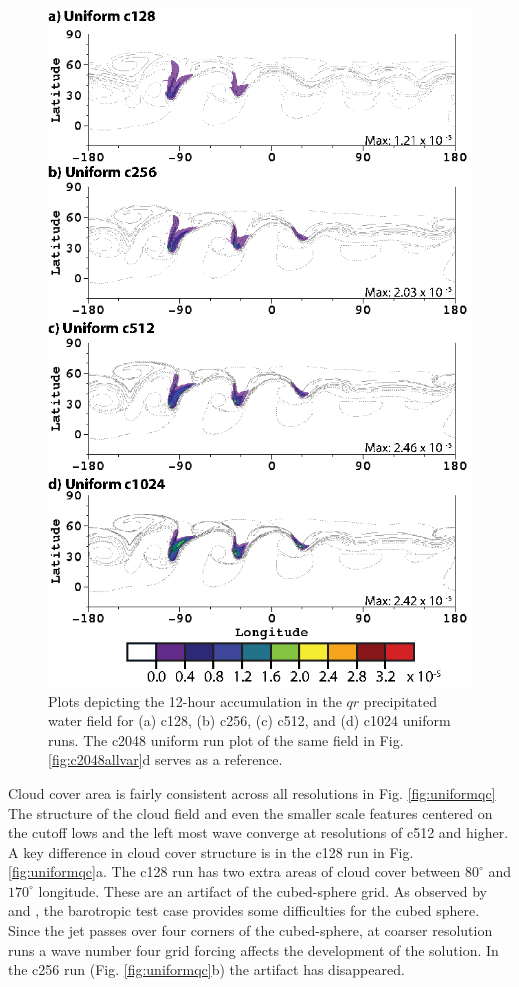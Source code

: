 \begin{figure}
   \centerline{%
   \noindent
   \includegraphics[width=\textwidth,height=\textheight,keepaspectratio]{Chap2/A_qrdt_uniform-01}}
   \caption{Plots depicting the 12-hour accumulation in the $qr$ precipitated water field for
   (a) c128, (b) c256, (c) c512, and (d) c1024 uniform runs. The c2048 uniform run
   plot of the same field in Fig. \ref{fig:c2048allvar}d serves as a reference.
      }
   \label{fig:uniformqrdt}
\end{figure}

Cloud cover area is fairly consistent across all resolutions in Fig. \ref{fig:uniformqc}
The structure of the cloud field and even the smaller scale features centered on the cutoff 
lows and the left most wave converge at resolutions of c512 and higher. A key
difference in cloud cover structure is in the c128 run in Fig. \ref{fig:uniformqc}a.
The c128 run has two extra areas of cloud cover between $80^\circ$ and
$170^\circ$ longitude. These are an artifact of the cubed-sphere grid.
As observed by \cite{st2007comparison} and \cite{ullrich:2010vn}, the barotropic
test case provides some difficulties for the cubed sphere. Since the jet passes
over four corners of the cubed-sphere, at coarser resolution runs a wave number
four grid forcing affects the development of the solution. In the c256 run (Fig. \ref{fig:uniformqc}b) 
the artifact has disappeared.

